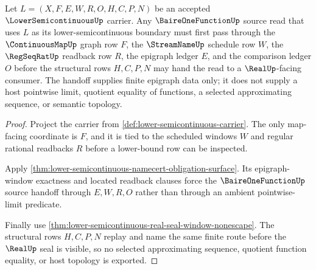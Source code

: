 \begin{theorem}
\label{thm:lower-semicontinuous-baireone-source-handoff}
Let $L=(X,F,E,W,R,O,H,C,P,N)$ be an accepted
$\LowerSemicontinuousUp$ carrier. Any $\BaireOneFunctionUp$ source read that
uses $L$ as its lower-semicontinuous boundary must first pass through the
$\ContinuousMapUp$ graph row $F$, the $\StreamNameUp$ schedule row $W$, the
$\RegSeqRatUp$ readback row $R$, the epigraph ledger $E$, and the comparison
ledger $O$ before the structural rows $H,C,P,N$ may hand the read to a
$\RealUp$-facing consumer. The handoff supplies finite epigraph data only; it
does not supply a host pointwise limit, quotient equality of functions, a
selected approximating sequence, or semantic topology.
\end{theorem}
\begin{proof}
Project the carrier from \autoref{def:lower-semicontinuous-carrier}. The only
map-facing coordinate is $F$, and it is tied to the scheduled windows $W$ and
regular rational readbacks $R$ before a lower-bound row can be inspected.

Apply \autoref{thm:lower-semicontinuous-namecert-obligation-surface}. Its
epigraph-window exactness and located readback clauses force the
$\BaireOneFunctionUp$ source handoff through $E,W,R,O$ rather than through an
ambient pointwise-limit predicate.

Finally use \autoref{thm:lower-semicontinuous-real-seal-window-nonescape}. The
structural rows $H,C,P,N$ replay and name the same finite route before the
$\RealUp$ seal is visible, so no selected approximating sequence, quotient
function equality, or host topology is exported.
\end{proof}

